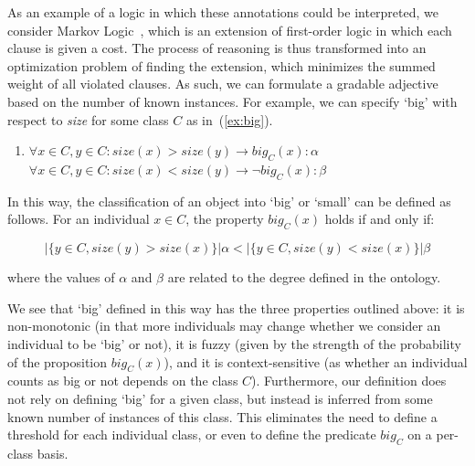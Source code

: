 \documentclass[11pt]{article}
\begin{document}
As an example of a logic in which these 
annotations could be interpreted, we consider Markov Logic~\cite{richardson2006markov}, which is an 
extension of first-order logic in which each clause is given a cost. The process 
of reasoning is thus transformed into an optimization problem of finding the 
extension, which minimizes the summed weight of all violated clauses. As such, we
can formulate a gradable adjective based on the number of known instances. 
For example, we can specify `big' with respect to \emph{size} for some class $C$ as in~(\ref{ex:big}).
%
\begin{enumerate}
\item $\forall x \in C, y \in C : size(x) > size(y) \rightarrow big_C(x) : \alpha$ \\
$\forall x \in C, y \in C : size(x) < size(y) \rightarrow \neg big_C(x) : \beta$
\label{ex:big}
\end{enumerate}
%
In this way, the classification of an object into `big' or `small' can be defined as follows.
For an individual $x \in C$, the property $big_C(x)$ holds if and only if: 

\vspace{-1.0em}
$$|\{y \in C, size(y) > size(x)\}| \alpha < |\{y \in C, size(y) < size(x)\}| \beta$$
\vspace{-1.5em}

where the values of $\alpha$ and $\beta$ are related to the degree defined
in the ontology.

We see that `big' defined in this way has the three properties outlined above: 
it is non-monotonic (in that more individuals may change whether we consider an individual 
to be `big' or not), it is fuzzy (given by the strength of the probability of the proposition $big_C(x)$), 
and it is context-sensitive (as whether an individual counts as big or not depends on the class $C$). 
Furthermore, our definition does not rely on defining `big' for a given class, but instead is inferred
from some known number of instances of this class. This eliminates the need to
define a threshold for each individual class, or even to define the predicate $big_C$ on a per-class
basis.
\end{document}
